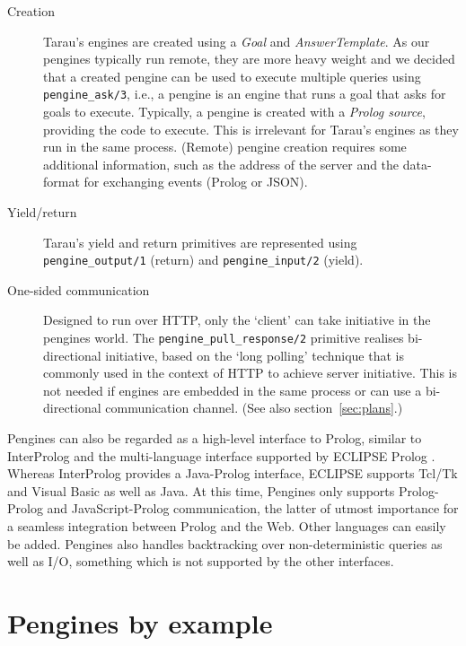 \documentclass{new_tlp}
\newcommand{\reffont}{\tt}
\newcommand{\predref}[2]{\mbox{\reffont #1/#2}}
\newcommand{\secref}[1]{section~\ref{sec:#1}}
\renewcommand{\arg}[1]{\textit{#1}}
\begin{document}
\begin{description}
    \item[Creation]
Tarau's engines are created using a \arg{Goal} and \arg{AnswerTemplate}.
As our pengines typically run remote, they are more heavy weight and we
decided that a created pengine can be used to execute multiple queries
using \predref{pengine\_ask}{3}, i.e., a pengine is an engine that
runs a goal that asks for goals to execute. Typically, a pengine is
created with a \textit{Prolog source}, providing the code to execute.
This is irrelevant for Tarau's engines as they run in the same process.
(Remote) pengine creation requires some additional information, such as
the address of the server and the data-format for exchanging events
(Prolog or JSON).

    \item[Yield/return]
Tarau's yield and return primitives are represented using
\predref{pengine\_output}{1} (return) and \predref{pengine\_input}{2}
(yield).

    \item[One-sided communication]
Designed to run over HTTP, only the `client' can take initiative in the
pengines world. The \predref{pengine\_pull\_response}{2} primitive
realises bi-directional initiative, based on the `long polling'
technique that is commonly used in the context of HTTP to achieve server
initiative. This is not needed if engines
are embedded in the same process or can use a bi-directional
communication channel. (See also \secref{plans}.)
\end{description}

Pengines can also be regarded as a high-level interface to Prolog,
similar to InterProlog \cite{DBLP:conf/jelia/Calejo04} and the
multi-language interface supported by ECLIPSE Prolog
\cite{DBLP:conf/padl/ShenSNS02}. Whereas InterProlog provides a
Java-Prolog interface, ECLIPSE supports Tcl/Tk and Visual Basic as well
as Java. At this time, Pengines only supports Prolog-Prolog and
JavaScript-Prolog communication, the latter of utmost importance for a
seamless integration between Prolog and the Web. Other languages can
easily be added. Pengines also handles backtracking over
non-deterministic queries as well as I/O, something which is not
supported by the other interfaces.




 
\section{Pengines by example}
\label{sec:examples}
\end{document}
